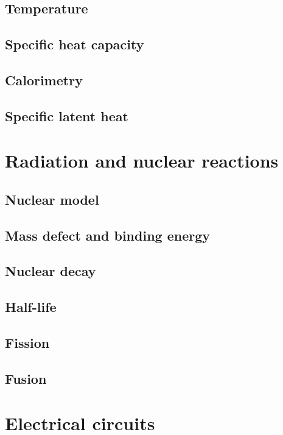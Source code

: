 \documentclass{book}
\begin{document}
\section{Temperature}

\section{Specific heat capacity}

\section{Calorimetry}

\section{Specific latent heat}

\chapter{Radiation and nuclear reactions}
\section{Nuclear model}

\section{Mass defect and binding energy}

\section{Nuclear decay}

\section{Half-life}

\section{Fission}

\section{Fusion}

\chapter{Electrical circuits}
\end{document}
